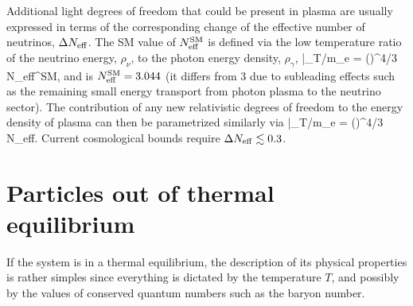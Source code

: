 Additional light degrees of freedom that could be present in plasma are usually expressed in terms of the corresponding change of the effective number of neutrinos, $\Delta N_{\rm eff}$. 
The SM value of $N_{\rm eff}^{\rm SM}$ is defined via the low temperature ratio of the neutrino energy, $\rho_\nu$, to the photon energy density, $\rho_\gamma$, 
\beq
\frac{\rho_\nu}{\rho_\gamma}\Big|_{T/m_e} =  \Big(\Big)^{4/3} N_{\rm eff}^{\rm SM}, 
\eeq
and is $N_{\rm eff}^{\rm SM}=3.044$ (it differs from 3 due to subleading effects such as the remaining small energy transport from photon plasma to the neutrino sector). The contribution of any new relativistic degrees of freedom to the energy density of plasma can then be parametrized similarly via 
\beq
\label{eq:DeltaNeff}
\Big|_{T/m_e} =  \Big(\Big)^{4/3} \Delta N_{\rm eff}. 
\eeq
Current cosmological bounds require $\Delta N_{\rm eff}\lesssim 0.3$.

\section{Particles out of thermal equilibrium}
If the system is in a thermal equilibrium, the description of its physical properties is rather simples since everything is dictated by the temperature $T$, and possibly by
the values of conserved quantum numbers such as the baryon number. 

